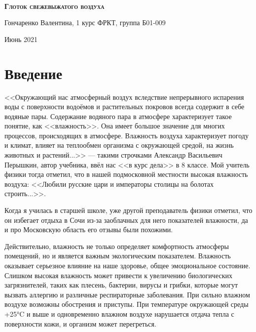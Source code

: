 \documentclass[a4paper,12pt]{article} %
\begin{document}

\begin{titlepage}
\begin{center}
\
\vfill

{\LARGE \textsc{\textbf{Глоток свежевыжатого воздуха\\}}}

\vspace{2em}

Гончаренко Валентина, 1 курс ФРКТ, группа Б01-009

\vfill

Июнь 2021
\end{center}
\end{titlepage}


\newpage
\tableofcontents{} %
\newpage


\section{Введение}

<<Окружающий нас атмосферный воздух вследствие непрерывного испарения воды с поверхности водоёмов и растительных покровов всегда содержит в себе водяные пары. Содержание водяного пара в атмосфере характеризует такое понятие, как <<влажность>>. Она имеет большое значение для многих процессов, происходящих в атмосфере. Влажность воздуха характеризует погоду и климат, влияет на теплообмен организма с окружающей средой, на жизнь животных и растений...>> --- такими строчками Александр Васильевич Перышкин, автор учебника, ввёл нас <<в курс дела>> в 8 классе. Мой учитель физики тогда отметил, что в нашей подмосковной местности высокая влажность воздуха: <<Любили русские цари и императоры столицы на болотах строить...>>. 

Когда я училась в старшей школе, уже другой преподаватель физики отметил, что он избегает отдыха в Сочи из-за заоблачных для него показателей влажности, да и про Московскую область его отзывы были похожими. 

Действительно, влажность не только определяет комфортность атмосферы помещений, но и является важным экологическим показателем. Влажность оказывает серьезное влияние на наше здоровье, общее эмоциональное состояние. Слишком высокая влажность может привести к увеличению биологических загрязнителей, таких как плесень, бактерии, вирусы и грибки, которые могут вызвать аллергию и различные респираторные заболевания. При сильно влажном воздухе возможны обострения и приступы. При температуре окружающей среды +25°C и выше и одновременно влажном воздухе нарушается отдача тепла с поверхности кожи, и организм может перегреться.
\end{document}
